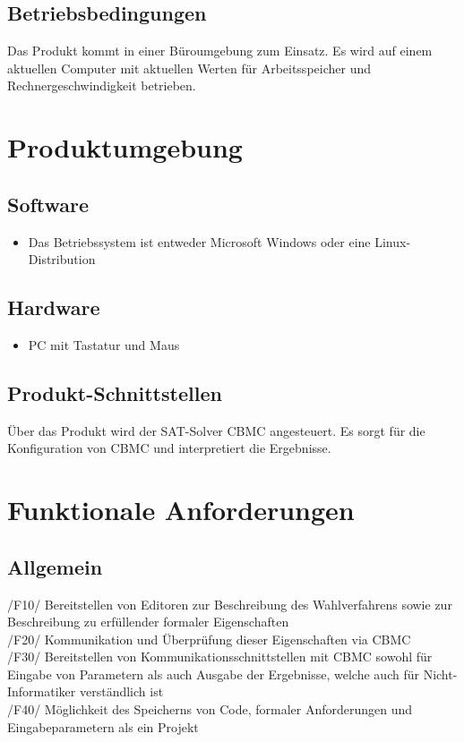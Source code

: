 \documentclass[a4paper]{scrreprt}
\begin{document}
\section{Betriebsbedingungen}
Das Produkt kommt in einer Büroumgebung zum Einsatz. Es wird auf einem aktuellen Computer mit aktuellen Werten für Arbeitsspeicher und Rechnergeschwindigkeit betrieben.


\chapter{Produktumgebung}

\section{Software}
\begin{itemize}
\item Das Betriebssystem ist entweder Microsoft Windows oder eine Linux-Distribution
\end{itemize}

\section{Hardware}
\begin{itemize}
\item PC mit Tastatur und Maus
\end{itemize}

\section{Produkt-Schnittstellen}
Über das Produkt wird der SAT-Solver CBMC angesteuert. Es sorgt für die Konfiguration von CBMC und interpretiert die Ergebnisse.



\chapter{Funktionale Anforderungen}
\section{Allgemein}
/F10/ Bereitstellen von Editoren zur Beschreibung des Wahlverfahrens sowie zur Beschreibung zu erfüllender formaler Eigenschaften \\
/F20/ Kommunikation und Überprüfung dieser Eigenschaften via CBMC \\
/F30/ Bereitstellen von Kommunikationsschnittstellen mit CBMC sowohl für Eingabe von Parametern als auch Ausgabe der Ergebnisse, welche auch für Nicht-Informatiker verständlich ist \\
/F40/ Möglichkeit des Speicherns von Code, formaler Anforderungen und Eingabeparametern als ein Projekt \\
\end{document}
